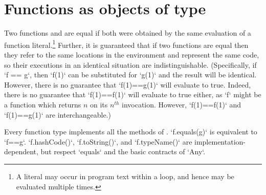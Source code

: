 \section{Functions as objects of type }
\label{FunctionAnyMethods}

\label{FunctionEquality}
  Two functions  and
 are equal if both were obtained by the same evaluation of a function
literal.\footnote{A literal may occur in program text within a loop, and hence
  may be evaluated multiple times.} Further, it is guaranteed that if two
functions are equal then they refer to the same locations in the environment
and represent the same code, so their executions in an identical situation are
indistinguishable. (Specifically, if \xcd`f == g`, then \xcd`f(1)` can be
substituted for \xcd`g(1)` and the result will be identical. However, there is
no guarantee that \xcd`f(1)==g(1)` will evaluate to true. Indeed, there is no
guarantee that \xcd`f(1)==f(1)` will evaluate to true either, as \xcd`f` might
be a function which returns {$n$} on its {$n^{th}$} invocation. However,
\xcd`f(1)==f(1)` and \xcd`f(1)==g(1)` are interchangeable.)


Every function type implements all the methods of .
\xcd`f.equals(g)` is equivalent to \xcd`f==g`.  \xcd`f.hashCode()`, 
\xcd`f.toString()`, and \xcd`f.typeName()` are implementation-dependent, but
respect \xcd`equals` and the basic contracts of \xcd`Any`. 



